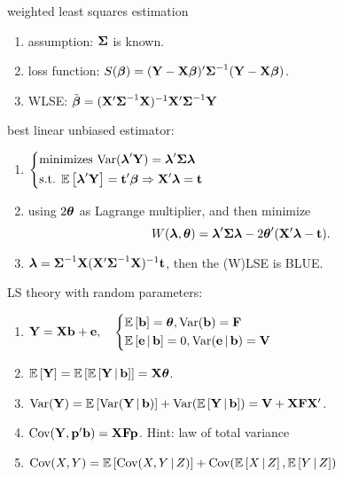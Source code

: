 weighted least squares estimation \begin{enumerate}
    \item assumption: $\bSigma$ is known.
    \item loss function: $S(\bbeta) = (\bY - \bX\bbeta)'\bSigma^{-1}(\bY - \bX\bbeta)$.
    \item WLSE: $\tilde{\bbeta} = (\bX' \bSigma^{-1} \bX)^{-1} \bX' \bSigma^{-1} \bY$
\end{enumerate}

best linear unbiased estimator: \begin{enumerate}
    \item $
        \begin{dcases}
            \text{minimizes } \var{\blam'\bY} = \blam'\bSigma\blam\\
            \text{s.t. } \bE{\blam'\bY} = \bt'\bbeta \Rightarrow \bX'\blam = \bt
        \end{dcases}
    $
    \item using $2\btheta$ as Lagrange multiplier, and then minimize $$
        W(\blam, \btheta) = \blam'\bSigma\blam - 2\btheta'(\bX'\blam - \bt).
    $$
    \item $\blam = \bSigma^{-1} \bX (\bX' \bSigma^{-1} \bX)^{-1} \bt$, then the (W)LSE is BLUE.
\end{enumerate}

LS theory with random parameters: \begin{enumerate}
    \item [] $\bY = \bX \bb + \be, \quad \begin{dcases}
        \bE{\bb} = \btheta, \var{\bb} = \bF \\
        \bE{\be \cond \bb} = 0, \var{\be \cond \bb} = \bV
    \end{dcases}$
    \item $\bE{\bY} = \bE{\bE{\bY \cond \bb}} = \bX \btheta$.
    \item [] $\var{\bY} = \bE{\var{\bY \cond \bb}} + \var{\bE{\bY \cond \bb}} = \bV + \bX\bF\bX'$.
    \item [] $\cov{\bY}{\bp'\bb} = \bX \bF \bp$. Hint: law of total variance
    \item [] $\cov{X}{Y} = \bE{\cov{X}{Y \cond Z}} + \cov{\bE{X \cond Z}}{\bE{Y \cond Z}}$
\end{enumerate}


